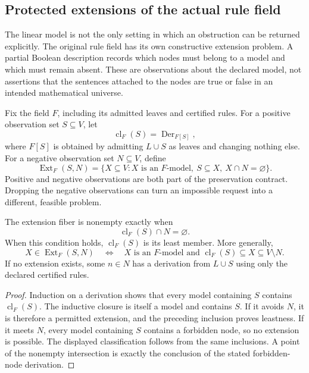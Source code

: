 \subsection{Protected extensions of the actual rule field}
\label{sec:protected-rule-extension}

The linear model is not the only setting in which an obstruction can be returned explicitly. The original rule field has its own constructive extension problem. A partial Boolean description records which nodes must belong to a model and which must remain absent. These are observations about the declared model, not assertions that the sentences attached to the nodes are true or false in an intended mathematical universe.

Fix the field $F$, including its admitted leaves and certified rules. For a positive observation set $S\subseteq V$, let
\[
  \operatorname{cl}_F(S)=\operatorname{Der}_{F[S]},
\]
where $F[S]$ is obtained by admitting $L\cup S$ as leaves and changing nothing else. For a negative observation set $N\subseteq V$, define
\[
 \operatorname{Ext}_F(S,N)=
 \{X\subseteq V:X\text{ is an }F\text{-model},\ S\subseteq X,\ X\cap N=\varnothing\}.
\]
Positive and negative observations are both part of the preservation contract. Dropping the negative observations can turn an impossible request into a different, feasible problem.

\begin{theorem}
\label{res:new:extension}
The extension fiber is nonempty exactly when
\[
 \operatorname{cl}_F(S)\cap N=\varnothing.
\]
When this condition holds, $\operatorname{cl}_F(S)$ is its least member. More generally,
\[
 X\in\operatorname{Ext}_F(S,N)
 \quad\Longleftrightarrow\quad
 X\text{ is an }F\text{-model and }
 \operatorname{cl}_F(S)\subseteq X\subseteq V\setminus N.
\]
If no extension exists, some $n\in N$ has a derivation from $L\cup S$ using only the declared certified rules.
\end{theorem}
\begin{proof}
Induction on a derivation shows that every model containing $S$ contains $\operatorname{cl}_F(S)$. The inductive closure is itself a model and contains $S$. If it avoids $N$, it is therefore a permitted extension, and the preceding inclusion proves leastness. If it meets $N$, every model containing $S$ contains a forbidden node, so no extension is possible. The displayed classification follows from the same inclusions. A point of the nonempty intersection is exactly the conclusion of the stated forbidden-node derivation.
\end{proof}

